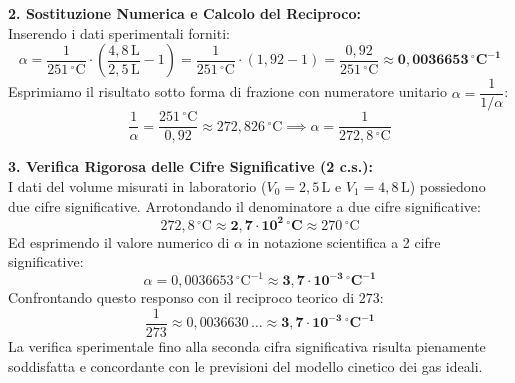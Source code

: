 \documentclass[11pt,a4paper,oneside]{report}
\begin{document}
\begin{problema}
\textbf{2. Sostituzione Numerica e Calcolo del Reciproco:}\\
Inserendo i dati sperimentali forniti:
\[
\alpha = \frac{1}{251\,^\circ\text{C}} \cdot \left(\frac{4{,}8\,\text{L}}{2{,}5\,\text{L}} - 1\right) = \frac{1}{251\,^\circ\text{C}} \cdot (1{,}92 - 1) = \frac{0{,}92}{251\,^\circ\text{C}} \approx \mathbf{0{,}0036653\,^\circ\text{C}^{-1}}
\]
Esprimiamo il risultato sotto forma di frazione con numeratore unitario $\alpha = \dfrac{1}{1/\alpha}$:
\[
\frac{1}{\alpha} = \frac{251\,^\circ\text{C}}{0{,}92} \approx 272{,}826\,^\circ\text{C} \implies \alpha = \frac{1}{272{,}8\,^\circ\text{C}}
\]

\textbf{3. Verifica Rigorosa delle Cifre Significative (2 c.s.):}\\
I dati del volume misurati in laboratorio ($V_0 = 2{,}5\,\text{L}$ e $V_1 = 4{,}8\,\text{L}$) possiedono due cifre significative.
Arrotondando il denominatore a due cifre significative:
\[
272{,}8\,^\circ\text{C} \approx \mathbf{2{,}7 \cdot 10^2\,^\circ\text{C}} \approx 270\,^\circ\text{C}
\]
Ed esprimendo il valore numerico di $\alpha$ in notazione scientifica a 2 cifre significative:
\[
\alpha = 0{,}0036653\,^\circ\text{C}^{-1} \approx \mathbf{3{,}7 \cdot 10^{-3}\,^\circ\text{C}^{-1}}
\]
Confrontando questo responso con il reciproco teorico di $273$:
\[
\frac{1}{273} \approx 0{,}0036630\,\dots \approx \mathbf{3{,}7 \cdot 10^{-3}\,^\circ\text{C}^{-1}}
\]
La verifica sperimentale fino alla seconda cifra significativa risulta pienamente soddisfatta e concordante con le previsioni del modello cinetico dei gas ideali.
\end{problema}
\end{document}

